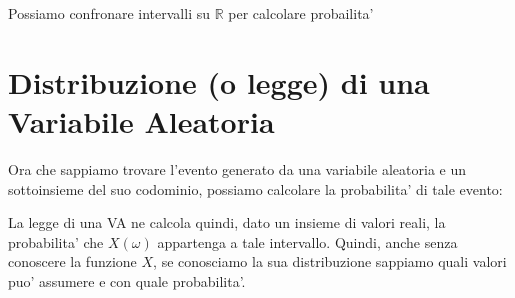    Possiamo confronare intervalli su $ \mathbb{R} $ per calcolare probailita'

 \section{Distribuzione (o legge) di una Variabile Aleatoria}

 Ora che sappiamo trovare l'evento generato da una variabile aleatoria e un sottoinsieme del suo codominio, possiamo calcolare la probabilita' di tale evento: 

 La legge di una VA ne calcola quindi, dato un insieme di valori reali, la probabilita' che $ X(\omega) $ appartenga a tale intervallo. Quindi, anche senza conoscere la funzione $ X $, se conosciamo la sua distribuzione sappiamo quali valori puo' assumere e con quale probabilita'.

